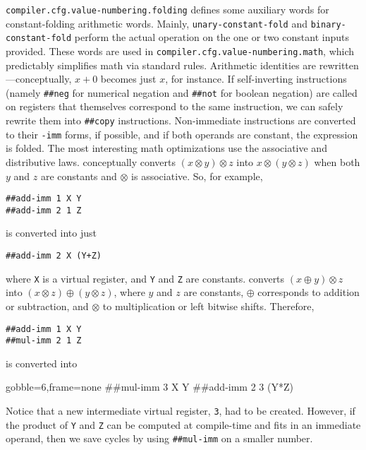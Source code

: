 \Verb|compiler.cfg.value-numbering.folding| defines some auxiliary words for
constant-folding arithmetic words.  Mainly, \Verb|unary-constant-fold| and
\Verb|binary-constant-fold| perform the actual operation on the one or two
constant inputs provided.  These words are used in
\Verb|compiler.cfg.value-numbering.math|, which predictably simplifies math
via standard rules.  Arithmetic identities are rewritten---conceptually, $x+0$
becomes just $x$, for instance.  If self-inverting instructions (namely
\Verb|##neg| for numerical negation and \Verb|##not| for boolean negation)
are called on registers that themselves correspond to the same instruction, we
can safely rewrite them into \Verb|##copy| instructions.  Non-immediate
instructions are converted to their \Verb|-imm| forms, if possible, and if
both operands are constant, the expression is folded.  The most interesting
math optimizations use the associative and distributive laws.
 conceptually converts $(x \otimes y) \otimes z$ into $x
\otimes (y \otimes z)$ when both $y$ and $z$ are constants and $\otimes$ is
associative.  So, for example,
%
\begin{center}
\Verb|##add-imm 1 X Y|\\
\Verb|##add-imm 2 1 Z|
\end{center}
%
\noindent is converted into just
%
\begin{center}
\Verb|##add-imm 2 X (Y+Z)|
\end{center}
%
\noindent where \Verb|X| is a virtual register, and \Verb|Y| and \Verb|Z|
are constants.   converts $(x \oplus y) \otimes z$ into $(x
\otimes z) \oplus (y \otimes z)$, where $y$ and $z$ are constants, $\oplus$
corresponds to addition or subtraction, and $\otimes$ to multiplication or left
bitwise shifts.  Therefore,
%
\begin{center}
\Verb|##add-imm 1 X Y|\\
\Verb|##mul-imm 2 1 Z|
\end{center}
%
\noindent is converted into
%
\begin{center}
  \begin{minipage}{0.2\linewidth}
    \begin{factorcode*}{gobble=6,frame=none}
      ##mul-imm 3 X Y
      ##add-imm 2 3 (Y*Z)
    \end{factorcode*}
  \end{minipage}
\end{center}
\noindent Notice that a new intermediate virtual register, \Verb|3|, had to
be created.  However, if the product of \Verb|Y| and \Verb|Z| can be
computed at compile-time and fits in an immediate operand, then we save cycles
by using \Verb|##mul-imm| on a smaller number.

